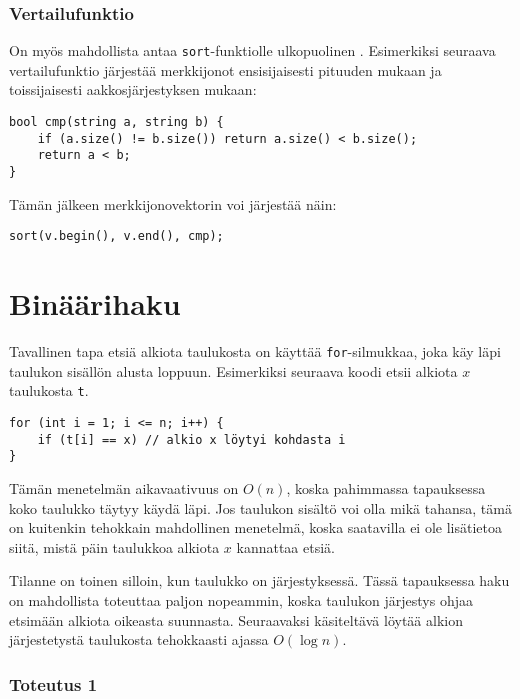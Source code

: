\subsubsection{Vertailufunktio}


On myös mahdollista antaa
\texttt{sort}-funktiolle ulkopuolinen .
Esimerkiksi seuraava vertailufunktio
järjestää merkkijonot ensisijaisesti pituuden mukaan
ja toissijaisesti aakkosjärjestyksen mukaan:

\begin{lstlisting}
bool cmp(string a, string b) {
    if (a.size() != b.size()) return a.size() < b.size();
    return a < b;
}
\end{lstlisting}
Tämän jälkeen merkkijonovektorin voi järjestää näin:
\begin{lstlisting}
sort(v.begin(), v.end(), cmp);
\end{lstlisting}

\section{Binäärihaku}


Tavallinen tapa etsiä alkiota taulukosta
on käyttää \texttt{for}-silmukkaa, joka käy läpi
taulukon sisällön alusta loppuun.
Esimerkiksi seuraava koodi etsii alkiota
$x$ taulukosta \texttt{t}.

\begin{lstlisting}
for (int i = 1; i <= n; i++) {
    if (t[i] == x) // alkio x löytyi kohdasta i
}
\end{lstlisting}

Tämän menetelmän aikavaativuus on $O(n)$,
koska pahimmassa tapauksessa koko taulukko täytyy
käydä läpi.
Jos taulukon sisältö voi olla mikä tahansa,
tämä on kuitenkin tehokkain mahdollinen menetelmä,
koska saatavilla ei ole lisätietoa siitä,
mistä päin taulukkoa alkiota $x$ kannattaa etsiä.

Tilanne on toinen silloin, kun taulukko on
järjestyksessä.
Tässä tapauksessa haku on mahdollista toteuttaa
paljon nopeammin, koska taulukon järjestys
ohjaa etsimään alkiota oikeasta suunnasta.
Seuraavaksi käsiteltävä 
löytää alkion järjestetystä taulukosta
tehokkaasti ajassa $O(\log n)$.

\subsubsection{Toteutus 1}

